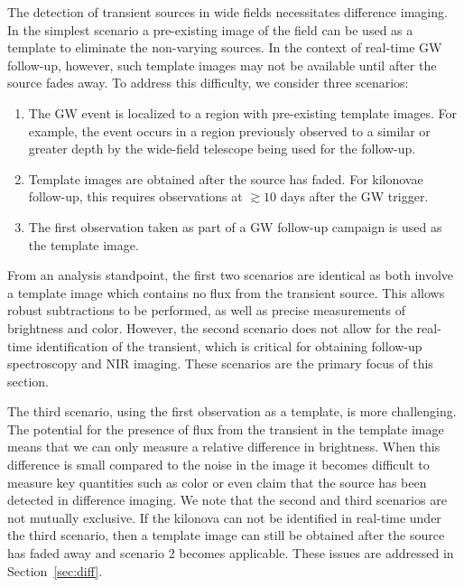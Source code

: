 The detection of transient sources in wide fields necessitates difference imaging. In the simplest scenario a pre-existing image of the field can be used as a template to eliminate the non-varying sources. In the context of real-time GW follow-up, however, such template images may not be available until after the source fades away. To address this difficulty, we consider three scenarios:
\begin{enumerate}
\item The GW event is localized to a region with pre-existing template images. For example, the event occurs in a region previously observed to a similar or greater depth by the wide-field telescope being used for the follow-up.
\item Template images are obtained after the source has faded. For kilonovae follow-up, this requires observations at $\gtrsim10$ days after the GW trigger.
\item The first observation taken as part of a GW follow-up campaign is used as the template image.
\end{enumerate}

From an analysis standpoint, the first two scenarios are identical as both involve a template image which contains no flux from the transient source. This allows robust subtractions to be performed, as well as precise measurements of brightness and color. However, the second scenario does not allow for the real-time identification of the transient, which is critical for obtaining follow-up spectroscopy and NIR imaging. These scenarios are the primary focus of this section. 

The third scenario, using the first observation as a template, is more challenging. The potential for the presence of flux from the transient in the template image means that we can only measure a relative difference in brightness. When this difference is small compared to the noise in the image it becomes difficult to measure key quantities such as color or even claim that the source has been detected in difference imaging. We note that the second and third scenarios are not mutually exclusive. If the kilonova can not be identified in real-time under the third scenario, then a template image can still be obtained after the source has faded away and scenario 2 becomes applicable. These issues are addressed in Section~\ref{sec:diff}.

